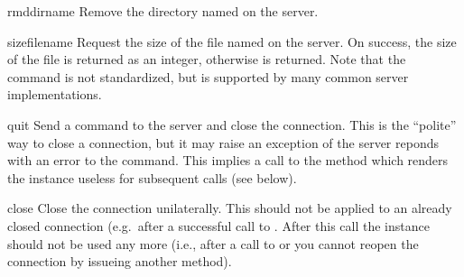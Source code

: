 \begin{methoddesc}{rmd}{dirname}
Remove the directory named  on the server.
\end{methoddesc}

\begin{methoddesc}{size}{filename}
Request the size of the file named  on the server.  On
success, the size of the file is returned as an integer, otherwise
 is returned.  Note that the  command is not 
standardized, but is supported by many common server implementations.
\end{methoddesc}

\begin{methoddesc}{quit}{}
Send a  command to the server and close the connection.
This is the ``polite'' way to close a connection, but it may raise an
exception of the server reponds with an error to the
 command.  This implies a call to the 
method which renders the  instance useless for subsequent
calls (see below).
\end{methoddesc}

\begin{methoddesc}{close}{}
Close the connection unilaterally.  This should not be applied to an
already closed connection (e.g.\ after a successful call to
.  After this call the  instance should not
be used any more (i.e., after a call to  or
 you cannot reopen the connection by issueing another
 method).
\end{methoddesc}
